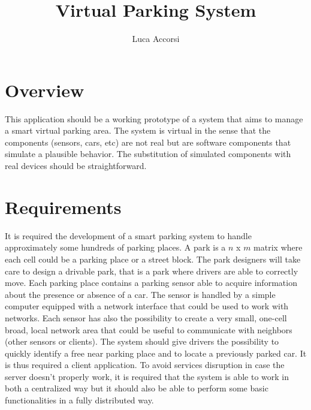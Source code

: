 \documentclass[11pt]{article}
\title{\textbf{Virtual Parking System}}
\author{Luca Accorsi}
\date{}
\begin{document}
\maketitle

\section{Overview}
This application should be a working prototype of a system that aims to manage a smart virtual parking area. The system is virtual in the sense that the components (sensors, cars, etc) are not real but are software components that simulate a plausible behavior. The substitution of simulated components with real devices should be straightforward.

\section{Requirements}
It is required the development of a smart parking system to handle approximately some hundreds of parking places. A park is a $n$ x $m$ matrix where each cell could be a parking place or a street block. The park designers will take care to design a drivable park, that is a park where drivers are able to correctly move. Each parking place contains a parking sensor able to acquire information about the presence or absence of a car. The sensor is handled by a simple computer equipped with a network interface that could be used to work with networks. Each sensor has also the possibility to create a very small, one-cell broad, local network area that could be useful to communicate with neighbors (other sensors or clients). The system should give drivers the possibility to quickly identify a free near parking place and to locate a previously parked car. It is thus required a client application. To avoid services disruption in case the server doesn't properly work, it is required that the system is able to work in both a centralized way but it should also be able to perform some basic functionalities in a fully distributed way.
\end{document}
